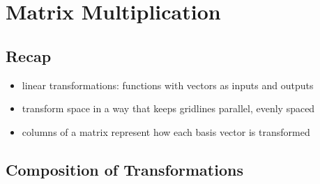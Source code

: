 \section{Matrix Multiplication}
\subsection{Recap}
\begin{itemize}
    \item linear transformations: functions with vectors as inputs and outputs
    \item transform space in a way that keeps gridlines parallel, evenly spaced
    \item columns of a matrix represent how each basis vector is transformed
\end{itemize}

\subsection{Composition of Transformations}

